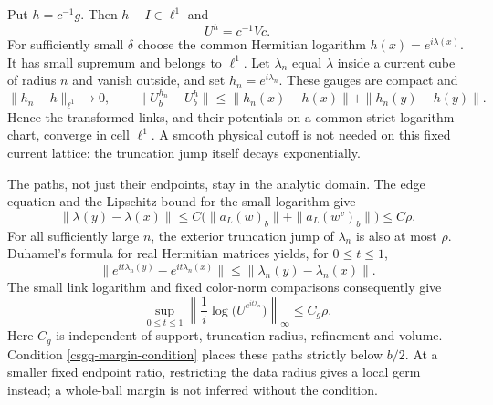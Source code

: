 \documentclass[11pt]{article}
\theoremstyle{remark}
\begin{document}
Put $h=c^{-1}g$. Then $h-I\in\ell^1$ and
\begin{equation}
                         U^h=c^{-1}Vc.
 \label{csgq-normalized-gauge}
\end{equation}
For sufficiently small $\delta$ choose the common Hermitian logarithm
$h(x)=e^{i\lambda(x)}$. It has small supremum and belongs to $\ell^1$.
Let $\lambda_n$ equal $\lambda$ inside a current cube of radius $n$
and vanish outside, and set $h_n=e^{i\lambda_n}$. These gauges are
compact and
\begin{equation}
 \|h_n-h\|_{\ell^1}\longrightarrow0,\qquad
 \|U^{h_n}_b-U^h_b\|
       \le\|h_n(x)-h(x)\|+\|h_n(y)-h(y)\|.
 \label{csgq-compact-gauge-limit}
\end{equation}
Hence the transformed links, and their potentials on a common strict
logarithm chart, converge in cell $\ell^1$. A smooth physical cutoff is
not needed on this fixed current lattice: the truncation jump itself
decays exponentially.

The paths, not just their endpoints, stay in the analytic domain.
The edge equation and the Lipschitz bound for the small logarithm give
\begin{equation}
 \|\lambda(y)-\lambda(x)\|
 \le C\bigl(\|a_L(w)_b\|+\|a_L(w^v)_b\|\bigr)\le C\rho.
 \label{csgq-log-gradient}
\end{equation}
For all sufficiently large $n$, the exterior truncation jump of
$\lambda_n$ is also at most $\rho$. Duhamel's formula for real
Hermitian matrices yields, for $0\le t\le1$,
\[
 \|e^{it\lambda_n(y)}-e^{it\lambda_n(x)}\|
                  \le\|\lambda_n(y)-\lambda_n(x)\|.
\]
The small link logarithm and fixed color-norm comparisons consequently
give
\begin{equation}
 \sup_{0\le t\le1}
   \left\|\frac1i\log\bigl(U^{e^{it\lambda_n}}\bigr)\right\|_\infty
                    \le C_g\rho.
 \label{csgq-path-margin}
\end{equation}
Here $C_g$ is independent of support, truncation radius, refinement and
volume. Condition \eqref{csgq-margin-condition} places these paths
strictly below $b/2$. At a smaller fixed endpoint ratio, restricting
the data radius gives a local germ instead; a whole-ball margin is
not inferred without the condition.
\end{document}
